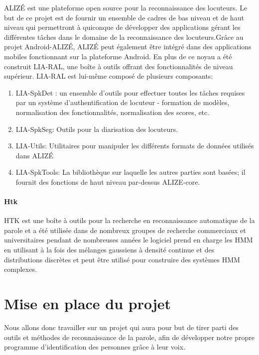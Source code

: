 \documentclass[a4paper, 12pt]{book}
\newcounter{program}[subsection]
\begin{document}
ALIZÉ est une plateforme open source pour la reconnaissance des locuteurs. Le but de ce projet est de fournir un ensemble de cadres de bas niveau et de haut niveau qui permettront à quiconque de développer des applications gérant les différentes tâches dans le domaine de la reconnaissance des locuteurs.Grâce au projet Android-ALIZÉ, ALIZÉ peut également être intégré dans des applications mobiles fonctionnant sur la plateforme Android. En plus de ce noyau a été construit LIA-RAL, une boîte à outils offrant des fonctionnalités de niveau supérieur. LIA-RAL est lui-même composé de plusieurs composants:

\begin{enumerate}

\item LIA-SpkDet : un ensemble d'outils pour effectuer toutes les tâches requises par un système d'authentification de locuteur - formation de modèles, normalisation des fonctionnalités, normalisation des scores, etc.
\item LIA-SpkSeg: Outils pour la diarisation des locuteurs.
\item LIA-Utils: Utilitaires pour manipuler les différents formats de données utilisés dans ALIZÉ
\item LIA-SpkTools: La bibliothèque sur laquelle les autres parties sont basées; il fournit des fonctions de haut niveau par-dessus ALIZE-core.

\end{enumerate}

\subsubsection{Htk}
HTK est une boîte à outils pour la recherche en reconnaissance automatique de la parole et a été utilisée dans de nombreux groupes de recherche commerciaux et universitaires pendant de nombreuses années le logiciel prend en charge les HMM en utilisant à la fois des mélanges gaussiens à densité continue et des distributions discrètes et peut être utilisé pour construire des systèmes HMM complexes.

\chapter{Mise en place du projet}

Nous allons donc travailler sur un projet qui aura pour but de tirer parti des outils et méthodes de reconnaissance de la parole, afin de développer notre propre programme d'identification des personnes grâce à leur voix.
\end{document}
